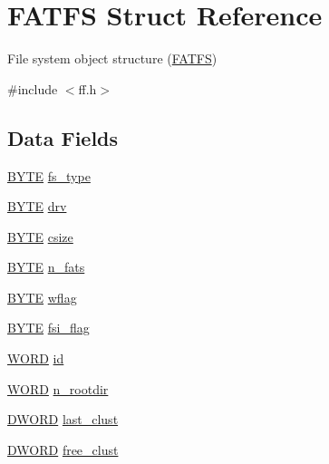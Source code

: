 \hypertarget{structFATFS}{}\section{F\+A\+T\+FS Struct Reference}
\label{structFATFS}


File system object structure (\hyperlink{structFATFS}{F\+A\+T\+FS})  




{\ttfamily \#include $<$ff.\+h$>$}

\subsection*{Data Fields}
\begin{DoxyCompactItemize}
\item 
\hyperlink{integer_8h_a4ae1dab0fb4b072a66584546209e7d58}{B\+Y\+TE} \hyperlink{structFATFS_add27d97babe807b573eac98a71dc4ae5}{fs\+\_\+type}
\item 
\hyperlink{integer_8h_a4ae1dab0fb4b072a66584546209e7d58}{B\+Y\+TE} \hyperlink{structFATFS_a6a791560e2687e8b1569bfce61208d2d}{drv}
\item 
\hyperlink{integer_8h_a4ae1dab0fb4b072a66584546209e7d58}{B\+Y\+TE} \hyperlink{structFATFS_a504a1175f6dcc9a854b9da94463bd108}{csize}
\item 
\hyperlink{integer_8h_a4ae1dab0fb4b072a66584546209e7d58}{B\+Y\+TE} \hyperlink{structFATFS_a56716c7e7ac10cf46e73ffb2a2e9b545}{n\+\_\+fats}
\item 
\hyperlink{integer_8h_a4ae1dab0fb4b072a66584546209e7d58}{B\+Y\+TE} \hyperlink{structFATFS_a647e43c9ccae94b7274793d1909897de}{wflag}
\item 
\hyperlink{integer_8h_a4ae1dab0fb4b072a66584546209e7d58}{B\+Y\+TE} \hyperlink{structFATFS_a84e9cdc5a6a8e33ea7ec192058abf161}{fsi\+\_\+flag}
\item 
\hyperlink{integer_8h_a197942eefa7db30960ae396d68339b97}{W\+O\+RD} \hyperlink{structFATFS_a417095d7c20d56d417dc0998e0dd5a5c}{id}
\item 
\hyperlink{integer_8h_a197942eefa7db30960ae396d68339b97}{W\+O\+RD} \hyperlink{structFATFS_a189a00aa038044ffad0fc7f7dcf2aae1}{n\+\_\+rootdir}
\item 
\hyperlink{integer_8h_ad342ac907eb044443153a22f964bf0af}{D\+W\+O\+RD} \hyperlink{structFATFS_ad315def289218e26ab78ff90fde700d1}{last\+\_\+clust}
\item 
\hyperlink{integer_8h_ad342ac907eb044443153a22f964bf0af}{D\+W\+O\+RD} \hyperlink{structFATFS_a5fb49e6ac511bd97eaffdd636d0e4165}{free\+\_\+clust}

\end{DoxyCompactItemize}
